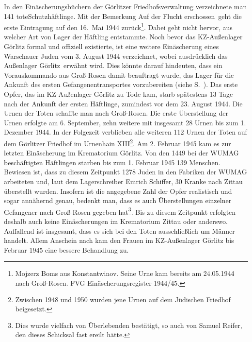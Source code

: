 \documentclass[a4paper,12pt,ngerman,
]{nisebook}
\begin{document}
In den Einäscherungsbüchern der Görlitzer Friedhofsverwaltung verzeichnete man 141 tote\linebreak \glqq Schutzhäftlinge\grqq. Mit der Bemerkung \glqq Auf der Flucht erschossen\grqq~geht die erste Eintragung auf den 16.~Mai 1944 zurück\footnote{Mojzerz Boms aus Konstantwinov. Seine Urne kam bereits am 24.05.1944 nach Groß-Rosen. FVG Einäscherungsregister 1944/45.}. Dabei geht nicht hervor, aus welcher Art von Lager der Häftling entstammte. Noch bevor das KZ-Außenlager Görlitz formal und offiziell existierte, ist eine weitere Einäscherung eines Warschauer Juden vom 3. August 1944 verzeichnet, wobei ausdrücklich das \glqq Außenlager Görlitz\grqq~erwähnt wird. Dies könnte darauf hindeuten, dass ein Vorauskommando aus Groß-Rosen damit beauftragt wurde, das Lager für die Ankunft des ersten Gefangenentransportes vorzubereiten (siehe S.~\pageref{vorauskommando}).
\newline
Das erste Opfer, das im KZ-Außenlager Görlitz zu Tode kam, starb spätestens 13 Tage nach der Ankunft der ersten Häftlinge, zumindest vor dem 23. August 1944. Die Urnen der Toten schaffte man nach Groß-Rosen. Die erste Überstellung der Urnen erfolgte am 6. September, zehn weitere mit insgesamt 28 Urnen bis zum 1. Dezember 1944. In der Folgezeit verblieben alle weiteren 112 Urnen der Toten auf dem Görlitzer Friedhof im Urnenhain XIII\footnote{Zwischen 1948 und 1950 wurden jene Urnen auf dem Jüdischen Friedhof beigesetzt.}. Am 2. Februar 1945 kam es zur letzten Einäscherung im Krematorium Görlitz. Von den 1449 bei der WUMAG beschäftigten Häftlingen starben bis zum 1. Februar 1945 139 Menschen. Bewiesen ist, dass zu diesem Zeitpunkt 1278 Juden in den Fabriken der WUMAG arbeiteten und, laut dem Lagerschreiber Emrich Schiffer, 30 Kranke nach Zittau überstellt wurden. Insofern ist die angegebene Zahl der Opfer realistisch und sogar annähernd genau, bedenkt man, dass es auch Überstellungen einzelner Gefangener nach Groß-Rosen gegeben hat\footnote{Dies wurde vielfach von Überlebenden bestätigt, so auch von Samuel Reifer, den dieses Schicksal fast ereilt hätte.}.
Bis zu diesem Zeitpunkt erfolgten deshalb auch keine Einäscherungen im Krematorium Zittau oder anderswo. 
~\newline
Auffallend ist insgesamt, dass es sich bei den Toten ausschließlich um Männer handelt. Allem Anschein nach kam den Frauen im KZ-Außenlager Görlitz bis Februar 1945 eine bessere Behandlung zu.
\end{document}
